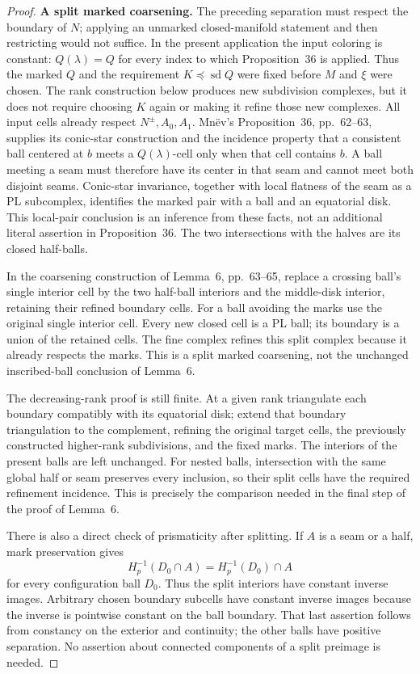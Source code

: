 \documentclass[11pt,a4paper]{article}
\theoremstyle{definition}
\begin{document}
\begin{proof}
\textbf{A split marked coarsening.}\quad
The preceding separation must respect the boundary of \(N\); applying
an unmarked closed-manifold statement and then restricting would not
suffice. In the present application the input coloring is constant:
\(Q(\lambda)=Q\) for every index to which Proposition~36 is applied.
Thus the marked \(Q\) and the requirement \(K\preceq\operatorname{sd}Q\)
were fixed before \(M\) and \(\xi\) were chosen. The rank construction
below produces new subdivision complexes, but it does not require
choosing \(K\) again or making it refine those new complexes.
All input cells already respect \(N^\pm,A_0,A_1\).
Mn\"ev's Proposition~36, pp.~62--63, supplies its conic-star
construction and the incidence property that a consistent ball
centered at \(b\) meets a \(Q(\lambda)\)-cell only when that cell
contains \(b\). A ball meeting a seam must therefore have its center
in that seam and cannot meet both disjoint seams.
Conic-star invariance, together with local flatness of the seam as
a PL subcomplex, identifies the marked pair with a ball and an
equatorial disk. This local-pair conclusion is an inference from
these facts, not an additional literal assertion in Proposition~36.
The two intersections with the halves are its closed half-balls.

In the coarsening construction of Lemma~6, pp.~63--65, replace a
crossing ball's single interior cell by the two half-ball interiors
and the middle-disk interior, retaining their refined boundary cells.
For a ball avoiding the marks use the original single interior cell.
Every new closed cell is a PL ball; its boundary is a union of the
retained cells. The fine complex refines this split complex because
it already respects the marks. This is a split marked coarsening,
not the unchanged inscribed-ball conclusion of Lemma~6.

The decreasing-rank proof is still finite. At a given rank triangulate
each boundary compatibly with its equatorial disk; extend that boundary
triangulation to the complement, refining the original target cells,
the previously constructed higher-rank subdivisions, and the fixed
marks. The interiors of the present balls are left unchanged.
For nested balls, intersection with the same global half or seam
preserves every inclusion, so their split cells have the required
refinement incidence. This is precisely the comparison needed in
the final step of the proof of Lemma~6.

There is also a direct check of prismaticity after splitting. If \(A\)
is a seam or a half, mark preservation gives
\begin{equation}
 H_p^{-1}(D_0\cap A)=H_p^{-1}(D_0)\cap A
 \label{equation-89}
\end{equation}
for every configuration ball \(D_0\). Thus the split interiors have
constant inverse images. Arbitrary chosen boundary subcells have
constant inverse images because the inverse is pointwise constant
on the ball boundary. That last assertion follows from constancy on
the exterior and continuity; the other balls have positive separation.
No assertion about connected components of a split preimage is needed.


\end{proof}
\end{document}
